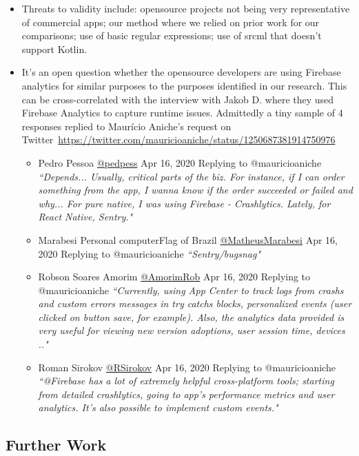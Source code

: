 \begin{itemize}
    \item Threats to validity include: opensource projects not being very representative of commercial apps; our method where we relied on prior work for our comparisons; use of basic regular expressions; use of srcml that doesn't support Kotlin.
    \item It's an open question whether the opensource developers are using Firebase analytics for similar purposes to the purposes identified in our research. This can be cross-correlated with the interview with Jakob D. where they used Firebase Analytics to capture runtime issues. Admittedly a tiny sample of 4 responses replied to Maurício Aniche's request on Twitter~\url{https://twitter.com/mauricioaniche/status/1250687381914750976} %
    \begin{itemize}
        \item Pedro Pessoa \href{https://twitter.com/pedpess}{@pedpess} Apr 16, 2020 Replying to @mauricioaniche \emph{``Depends... Usually, critical parts of the biz. For instance, if I can order something from the app, I wanna know if the order succeeded or failed and why... For pure native, I was using Firebase - Crashlytics. Lately, for React Native, Sentry."}
        \item Marabesi Personal computerFlag of Brazil \href{https://twitter.com/MatheusMarabesi}{@MatheusMarabesi} Apr 16, 2020 Replying to @mauricioaniche \emph{``Sentry/bugsnag"}
        \item Robson Soares Amorim \href{https://twitter.com/AmorimRob}{@AmorimRob} Apr 16, 2020 Replying to  @mauricioaniche \emph{``Currently, using App Center to track logs from crashs and custom errors messages in try catchs blocks, personalized events (user clicked on button save, for example). Also, the analytics data provided is very useful for viewing new version adoptions, user session time, devices .."}
        \item Roman Sirokov \href{https://twitter.com/RSirokov}{@RSirokov} Apr 16, 2020 Replying to  @mauricioaniche \emph{``@Firebase has a lot of extremely helpful cross-platform tools; starting from detailed crashlytics, going to app’s performance metrics and user analytics. It’s also possible to implement custom events."}
    \end{itemize}
\end{itemize}


\subsection*{Further Work}




